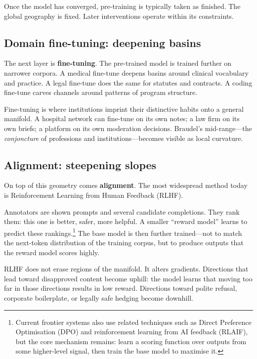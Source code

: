 \documentclass[12pt,a4paper]{article}
\begin{document}
Once the model has converged, pre-training is typically taken as finished. The global geography is fixed. Later interventions operate within its constraints.

\subsection*{Domain fine-tuning: deepening basins}

The next layer is \textbf{fine-tuning}. The pre-trained model is trained further on narrower corpora. A medical fine-tune deepens basins around clinical vocabulary and practice. A legal fine-tune does the same for statutes and contracts. A coding fine-tune carves channels around patterns of program structure.

Fine-tuning is where institutions imprint their distinctive habits onto a general manifold. A hospital network can fine-tune on its own notes; a law firm on its own briefs; a platform on its own moderation decisions. Braudel's mid-range---the \emph{conjoncture} of professions and institutions---becomes visible as local curvature.

\subsection*{Alignment: steepening slopes}

On top of this geometry comes \textbf{alignment}. The most widespread method today is Reinforcement Learning from Human Feedback (RLHF).

Annotators are shown prompts and several candidate completions. They rank them: this one is better, safer, more helpful. A smaller ``reward model'' learns to predict these rankings.\footnote{Current frontier systems also use related techniques such as Direct Preference Optimisation (DPO) and reinforcement learning from AI feedback (RLAIF), but the core mechanism remains: learn a scoring function over outputs from some higher-level signal, then train the base model to maximise it.} The base model is then further trained---not to match the next-token distribution of the training corpus, but to produce outputs that the reward model scores highly.

RLHF does not erase regions of the manifold. It alters gradients. Directions that lead toward disapproved content become uphill: the model learns that moving too far in those directions results in low reward. Directions toward polite refusal, corporate boilerplate, or legally safe hedging become downhill.
\end{document}
